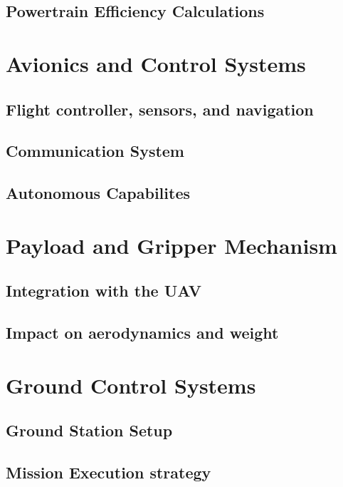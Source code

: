 \documentclass[12pt]{report}
\begin{document}
      \subsection{Powertrain Efficiency Calculations}
        
    \section{Avionics and Control Systems}
      \subsection{Flight controller, sensors, and navigation}
      \subsection{Communication System}
      \subsection{Autonomous Capabilites}

    \section{Payload and Gripper Mechanism}
      \subsection{Integration with the UAV}
      \subsection{Impact on aerodynamics and weight}

    \section{Ground Control Systems}
      \subsection{Ground Station Setup}
      \subsection{Mission Execution strategy}

\end{document}
